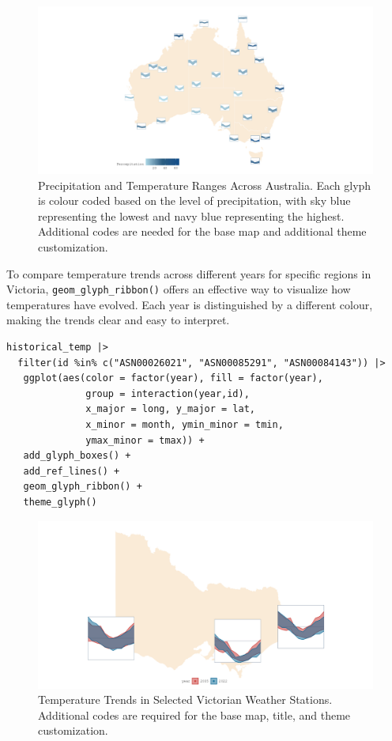 \begin{figure}

{\centering \includegraphics[width=1\linewidth]{figures/prcp_temp} 

}

\caption{Precipitation and Temperature Ranges Across Australia. Each glyph is colour coded based on the level of precipitation, with sky blue representing the lowest and navy blue representing the highest. Additional codes are needed for the base map and additional theme customization.}\label{fig:unnamed-chunk-11}
\end{figure}

To compare temperature trends across different years for specific regions in Victoria, \texttt{geom\_glyph\_ribbon()} offers an effective way to visualize how temperatures have evolved. Each year is distinguished by a different colour, making the trends clear and easy to interpret.

\begin{verbatim}
historical_temp |> 
  filter(id %in% c("ASN00026021", "ASN00085291", "ASN00084143")) |>
   ggplot(aes(color = factor(year), fill = factor(year),
              group = interaction(year,id),
              x_major = long, y_major = lat,
              x_minor = month, ymin_minor = tmin, 
              ymax_minor = tmax)) +
   add_glyph_boxes() +
   add_ref_lines() +
   geom_glyph_ribbon() +
   theme_glyph()
\end{verbatim}

\begin{figure}

{\centering \includegraphics[width=1\linewidth]{figures/hist_temp} 

}

\caption{Temperature Trends in Selected Victorian Weather Stations. Additional codes are required for the base map, title, and theme customization.}\label{fig:unnamed-chunk-13}
\end{figure}

